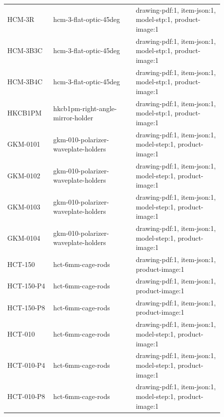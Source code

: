 \documentclass[10pt]{article}
\begin{document}
\begin{longtable}{p{0.18\linewidth}p{0.34\linewidth}p{0.36\linewidth}}
HCM-3R & hcm-3-flat-optic-45deg & drawing-pdf:1, item-json:1, model-stp:1, product-image:1 \\
HCM-3B3C & hcm-3-flat-optic-45deg & drawing-pdf:1, item-json:1, model-stp:1, product-image:1 \\
HCM-3B4C & hcm-3-flat-optic-45deg & drawing-pdf:1, item-json:1, model-stp:1, product-image:1 \\
HKCB1PM & hkcb1pm-right-angle-mirror-holder & drawing-pdf:1, item-json:1, model-stp:1, product-image:1 \\
GKM-0101 & gkm-010-polarizer-waveplate-holders & drawing-pdf:1, item-json:1, model-step:1, product-image:1 \\
GKM-0102 & gkm-010-polarizer-waveplate-holders & drawing-pdf:1, item-json:1, model-step:1, product-image:1 \\
GKM-0103 & gkm-010-polarizer-waveplate-holders & drawing-pdf:1, item-json:1, model-step:1, product-image:1 \\
GKM-0104 & gkm-010-polarizer-waveplate-holders & drawing-pdf:1, item-json:1, model-step:1, product-image:1 \\
HCT-150 & hct-6mm-cage-rods & drawing-pdf:1, item-json:1, product-image:1 \\
HCT-150-P4 & hct-6mm-cage-rods & drawing-pdf:1, item-json:1, product-image:1 \\
HCT-150-P8 & hct-6mm-cage-rods & drawing-pdf:1, item-json:1, product-image:1 \\
HCT-010 & hct-6mm-cage-rods & drawing-pdf:1, item-json:1, model-step:1, product-image:1 \\
HCT-010-P4 & hct-6mm-cage-rods & drawing-pdf:1, item-json:1, model-step:1, product-image:1 \\
HCT-010-P8 & hct-6mm-cage-rods & drawing-pdf:1, item-json:1, model-step:1, product-image:1 \\
\end{longtable}
\end{document}
